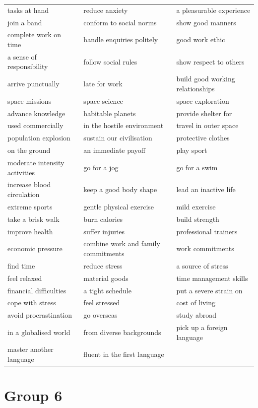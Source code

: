 \documentclass[10pt,a4paper]{article}
\begin{document}
{\begin{longtable}{@{}*{3}{p{}}@{}}
tasks at hand & reduce anxiety & a pleasurable experience \\
join a band & conform to social norms & show good manners \\
complete work on time & handle enquiries politely & good work ethic \\
a sense of responsibility & follow social rules & show respect to others \\
arrive punctually & late for work & build good working relationships \\
space missions & space science & space exploration \\
advance knowledge & habitable planets & provide shelter for \\
used commercially & in the hostile environment & travel in outer space \\
population explosion & sustain our civilisation & protective clothes \\
on the ground & an immediate payoff & play sport \\
moderate intensity activities & go for a jog & go for a swim \\
increase blood circulation & keep a good body shape & lead an inactive life \\
extreme sports & gentle physical exercise & mild exercise \\
take a brisk walk & burn calories & build strength \\
improve health & suffer injuries & professional trainers \\
economic pressure & combine work and family commitments & work commitments \\
find time & reduce stress & a source of stress \\
feel relaxed & material goods & time management skills \\
financial difficulties & a tight schedule & put a severe strain on \\
cope with stress & feel stressed & cost of living \\
avoid procrastination & go overseas & study abroad \\
in a globalised world & from diverse backgrounds & pick up a foreign language \\
master another language & fluent in the first language &  \\
\end{longtable}}

\section*{Group 6}
\end{document}

